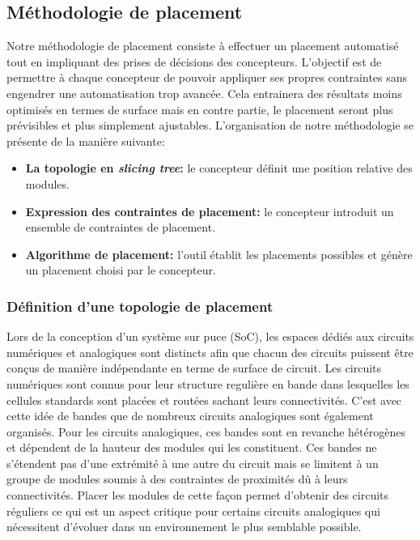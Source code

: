\subsection{Méthodologie de placement}
Notre méthodologie de placement consiste à effectuer un placement automatisé tout en impliquant des prises de décisions des concepteurs. L'objectif est de permettre à chaque concepteur de pouvoir appliquer ses propres contraintes sans engendrer une automatisation trop avancée. Cela entrainera des résultats moins optimisés en termes de surface mais en contre partie, le placement seront plus prévisibles et plus simplement ajustables. L'organisation de notre méthodologie se présente de la manière suivante:
\begin{itemize}
\item \textbf {La topologie en \textit{slicing tree}:} le concepteur définit une position relative des modules.
\item \textbf {Expression des contraintes de placement:} le concepteur introduit un ensemble de contraintes de placement.
\item \textbf {Algorithme de placement:} l'outil établit les placements possibles et génère un placement choisi par le concepteur.
\end{itemize}
\label{sec:Placement-methodologie}

\subsubsection{Définition d'une topologie de placement}
Lors de la conception d'un système sur puce (SoC), les espaces dédiés aux circuits numériques et analogiques sont distincts afin que chacun des circuits puissent être conçus de manière indépendante en terme de surface de circuit. Les circuits numériques sont connus pour leur structure regulière en bande dans lesquelles les cellules standards sont placées et routées sachant leurs connectivités. C'est avec cette idée de bandes que de nombreux circuits analogiques sont également organisés. Pour les circuits analogiques, ces bandes sont en revanche hétérogènes et dépendent de la hauteur des modules qui les constituent. Ces bandes ne s'étendent pas d'une extrémité à une autre du circuit mais se limitent à un groupe de modules soumis à des contraintes de proximités dû à leurs connectivités. Placer les modules de cette façon permet d'obtenir des circuits réguliers ce qui est un aspect critique pour certains circuits analogiques qui nécessitent d'évoluer dans un environnement le plus semblable possible. \newline


